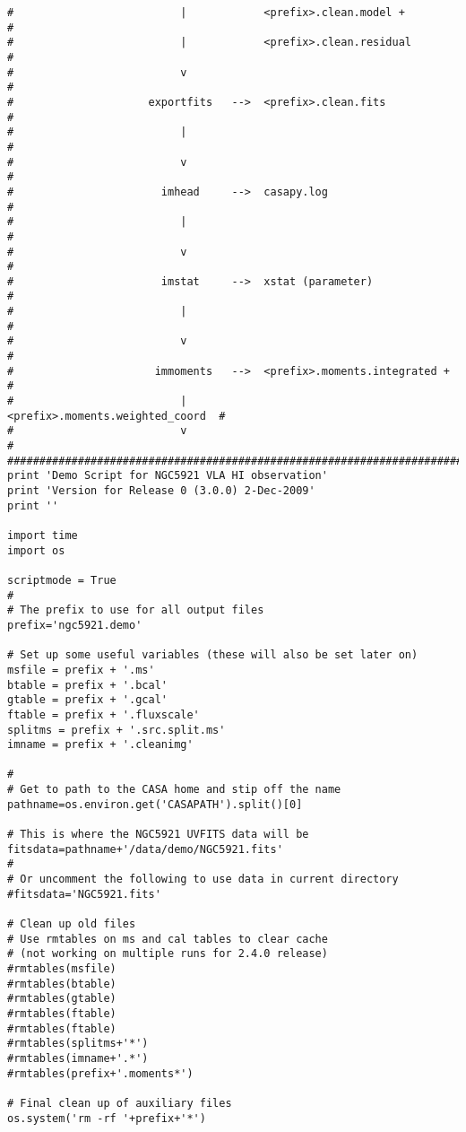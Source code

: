 \begin{verbatim}
#                          |            <prefix>.clean.model +           #
#                          |            <prefix>.clean.residual          #
#                          v                                             #
#                     exportfits   -->  <prefix>.clean.fits              #
#                          |                                             #
#                          v                                             #
#                       imhead     -->  casapy.log                       #
#                          |                                             #
#                          v                                             #
#                       imstat     -->  xstat (parameter)                #
#                          |                                             #
#                          v                                             #
#                      immoments   -->  <prefix>.moments.integrated +    #
#                          |            <prefix>.moments.weighted_coord  #
#                          v                                             #
##########################################################################
print 'Demo Script for NGC5921 VLA HI observation'
print 'Version for Release 0 (3.0.0) 2-Dec-2009'
print ''

import time
import os

scriptmode = True
# 
# The prefix to use for all output files
prefix='ngc5921.demo'

# Set up some useful variables (these will also be set later on)
msfile = prefix + '.ms'
btable = prefix + '.bcal'
gtable = prefix + '.gcal'
ftable = prefix + '.fluxscale'
splitms = prefix + '.src.split.ms'
imname = prefix + '.cleanimg'

#
# Get to path to the CASA home and stip off the name
pathname=os.environ.get('CASAPATH').split()[0]

# This is where the NGC5921 UVFITS data will be
fitsdata=pathname+'/data/demo/NGC5921.fits'
#
# Or uncomment the following to use data in current directory
#fitsdata='NGC5921.fits'

# Clean up old files
# Use rmtables on ms and cal tables to clear cache
# (not working on multiple runs for 2.4.0 release)
#rmtables(msfile)
#rmtables(btable)
#rmtables(gtable)
#rmtables(ftable)
#rmtables(ftable)
#rmtables(splitms+'*')
#rmtables(imname+'.*')
#rmtables(prefix+'.moments*')

# Final clean up of auxiliary files
os.system('rm -rf '+prefix+'*')


\end{verbatim}
